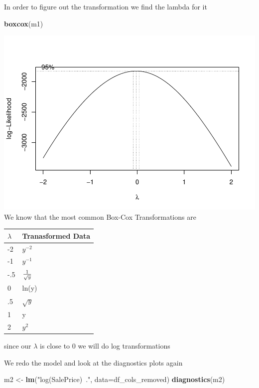 \documentclass[
]{article}
\newenvironment{Shaded}{\begin{snugshade}}{\end{snugshade}}
\newcommand{\DataTypeTok}[1]{\textcolor[rgb]{0.13,0.29,0.53}{#1}}
\newcommand{\KeywordTok}[1]{\textcolor[rgb]{0.13,0.29,0.53}{\textbf{#1}}}
\newcommand{\NormalTok}[1]{#1}
\newcommand{\StringTok}[1]{\textcolor[rgb]{0.31,0.60,0.02}{#1}}
\begin{document}
In order to figure out the transformation we find the lambda for it

\begin{Shaded}
\begin{Highlighting}[]
\KeywordTok{boxcox}\NormalTok{(m1)}
\end{Highlighting}
\end{Shaded}

\includegraphics{Final-Project_files/figure-latex/unnamed-chunk-16-1.pdf}
We know that the most common Box-Cox Transformations are

\begin{longtable}[]{@{}ll@{}}
\toprule
\(\lambda\) & Tranasformed Data\tabularnewline
\midrule
\endhead
-2 & \(y^{-2}\)\tabularnewline
-1 & \(y^{-1}\)\tabularnewline
-.5 & \(1 \over \sqrt y\)\tabularnewline
0 & ln(y)\tabularnewline
.5 & \(\sqrt y\)\tabularnewline
1 & y\tabularnewline
2 & \(y^2\)\tabularnewline
\bottomrule
\end{longtable}

since our \(\lambda\) is close to 0 we will do log transformations

We redo the model and look at the diagnostics plots again

\begin{Shaded}
\begin{Highlighting}[]
\NormalTok{m2 <-}\StringTok{ }\KeywordTok{lm}\NormalTok{(}\StringTok{"log(SalePrice)~."}\NormalTok{, }\DataTypeTok{data=}\NormalTok{df_cols_removed)}
\KeywordTok{diagnostics}\NormalTok{(m2)}
\end{Highlighting}
\end{Shaded}
\end{document}

